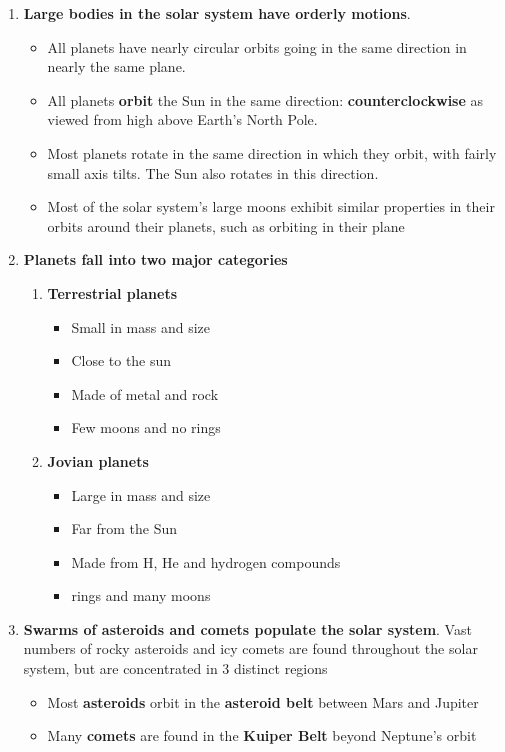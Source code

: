 \begin{enumerate}
\item {\bf Large bodies in the solar system have orderly motions}.
\begin{itemize}
\item All planets have nearly circular orbits going in the same direction in nearly the same plane.
\item  All planets {\bf orbit} the Sun in the same direction: {\bf counterclockwise} as viewed from high above Earth’s North Pole.
\item Most planets rotate in the same direction in which they orbit, with fairly small axis tilts. The Sun also rotates in this direction.
\item Most of the solar system’s large moons exhibit similar properties in their orbits around their planets, such as orbiting in their plane
\end{itemize}
\item {\bf Planets fall into two major categories}
\begin{enumerate}
\item {\bf Terrestrial planets}
\begin{itemize}
\item Small in mass and size
\item Close to the sun
\item Made of metal and rock
\item Few moons and no rings
\end{itemize}
\item {\bf Jovian planets}
\begin{itemize}
\item Large in mass and size
\item Far from the Sun
\item Made from H, He and hydrogen compounds
\item rings and many moons
\end{itemize}
\end{enumerate}
\item {\bf Swarms of asteroids and comets populate the solar system}. Vast numbers of rocky asteroids and icy comets are found throughout the solar system, but are concentrated in 3 distinct regions
\begin{itemize}
\item Most {\bf asteroids} orbit in the {\bf asteroid belt} between Mars and Jupiter
\item Many {\bf comets} are found in the {\bf Kuiper Belt} beyond Neptune's orbit

\end{itemize}
\end{enumerate}
